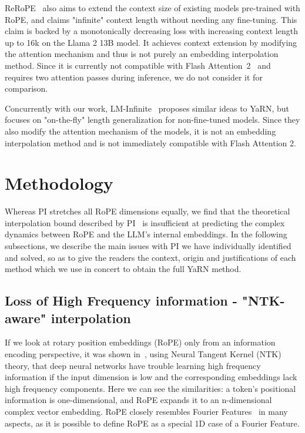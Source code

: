 \documentclass{article} %
\begin{document}
ReRoPE~\citep{rerope2023} also aims to extend the context size of existing models pre-trained with RoPE, and claims "infinite" context length without needing any fine-tuning.
This claim is backed by a monotonically decreasing loss with increasing context length up to 16k on the Llama 2 13B model.
It achieves context extension by modifying the attention mechanism and thus is not purely an embedding interpolation method.
Since it is currently not compatible with Flash Attention~2~\citep{dao2023flashattention2} and requires two attention passes during inference, we do not consider it for comparison.

Concurrently with our work, LM-Infinite~\citep{han2023lminfinite} proposes similar ideas to YaRN, but focuses on "on-the-fly" length generalization for non-fine-tuned models.
Since they also modify the attention mechanism of the models, it is not an embedding interpolation method and is not immediately compatible with Flash Attention 2.

\section{Methodology}

Whereas PI stretches all RoPE dimensions equally, we find that the theoretical interpolation bound described by PI~\citep{chen2023extending} is insufficient at predicting the complex dynamics between RoPE and the LLM's internal embeddings. In the following subsections, we describe the main issues with PI we have individually identified and solved, so as to give the readers the context, origin and justifications of each method which we use in concert to obtain the full YaRN method.


\subsection{Loss of High Frequency information - "NTK-aware" interpolation}\label{sec:ntkaware} %
If we look at rotary position embeddings (RoPE) only from an information encoding perspective, it was shown in~\citep{tancik2020fourier}, using Neural Tangent Kernel (NTK) theory, that deep neural networks have trouble learning high frequency information if the input dimension is low and the corresponding embeddings lack high frequency components. Here we can see the similarities: a token's positional information is one-dimensional, and RoPE expands it to an n-dimensional complex vector embedding. RoPE closely resembles Fourier Features~\citep{tancik2020fourier} in many aspects, as it is possible to define RoPE as a special 1D case of a Fourier Feature.
\end{document}
